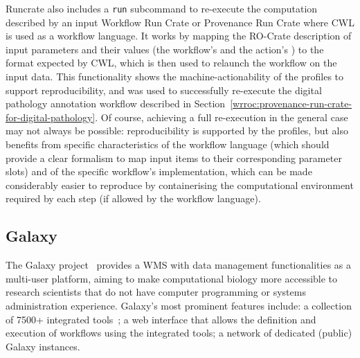 Runcrate also includes a \texttt{run} subcommand to re-execute the computation described by an input Workflow Run Crate or Provenance Run Crate where CWL is used as a workflow language.
It works by mapping the RO-Crate description of input parameters and their values (the workflow's
 and the action's ) to the format expected by CWL, which is then used to relaunch the workflow on the input data.
This functionality shows the machine-actionability of the profiles to support reproducibility, and was used to successfully re-execute the digital pathology annotation workflow described in Section~\ref{wrroc:provenance-run-crate-for-digital-pathology}.
%
Of course, achieving a full re-execution in the general case may not always be possible: reproducibility is supported by the profiles, but also benefits from specific characteristics of the workflow language (which should provide a clear formalism to map input items to their corresponding parameter slots) and of the specific workflow's implementation, which can be made considerably easier to reproduce by containerising the computational environment required by each step (if allowed by the workflow language).


\subsection{Galaxy}\label{wrroc:galaxy}

The Galaxy project~\cite{Galaxy 2022} provides a WMS with data management functionalities as a multi-user platform, aiming to make computational biology more accessible to research scientists that do not have computer programming or systems administration experience.
Galaxy's most prominent features include: a collection of 7500+ integrated tools~\cite{Blankenberg 2014};
a web interface that allows the definition and execution of workflows using the integrated tools; a network of dedicated (public) Galaxy instances.

